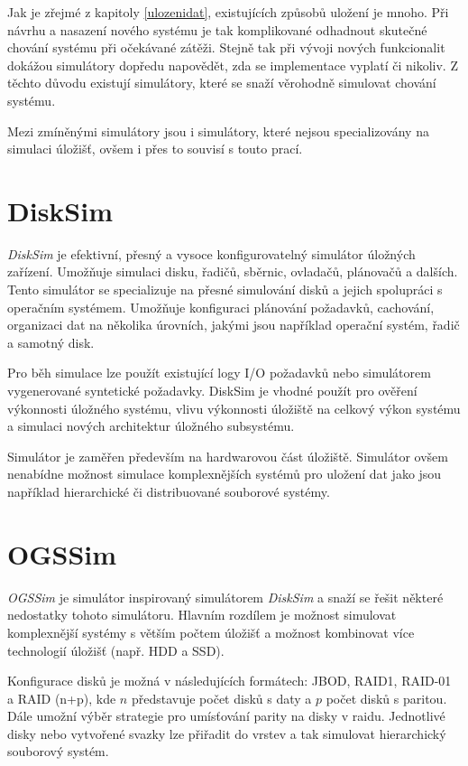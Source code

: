 \documentclass[czech,DP]{thesiskiv}
\begin{document}
Jak je zřejmé z kapitoly \ref{ulozenidat}, existujících způsobů uložení je mnoho. Při návrhu a nasazení nového systému je tak komplikované odhadnout skutečné chování systému při očekávané zátěži. Stejně tak při vývoji nových funkcionalit dokážou simulátory dopředu napovědět, zda se implementace vyplatí či nikoliv. Z těchto důvodu existují simulátory, které se snaží věrohodně simulovat chování systému.

Mezi zmíněnými simulátory jsou i simulátory, které nejsou specializovány na simulaci úložišť, ovšem i přes to souvisí s touto prací.

\section{DiskSim} 

\textit{DiskSim} \cite{disksimdoc} je efektivní, přesný a vysoce konfigurovatelný simulátor úložných zařízení. Umožňuje simulaci disku, řadičů, sběrnic, ovladačů, plánovačů a dalších. Tento simulátor se specializuje na přesné simulování disků a jejich spolupráci s operačním systémem. Umožňuje konfiguraci plánování požadavků, cachování, organizaci dat na několika úrovních, jakými jsou například operační systém, řadič a samotný disk.

Pro běh simulace lze použít existující logy I/O požadavků nebo simulátorem vygenerované syntetické požadavky. DiskSim je vhodné použít pro ověření výkonnosti úložného systému, vlivu výkonnosti úložiště na celkový výkon systému a simulaci nových architektur úložného subsystému. 

Simulátor je zaměřen především na hardwarovou část úložiště. Simulátor ovšem nenabídne možnost simulace komplexnějších systémů pro uložení dat jako jsou například hierarchické či distribuované souborové systémy.

\section{OGSSim}

\textit{OGSSim} \cite{ogssimpaper} je simulátor inspirovaný simulátorem \textit{DiskSim} a snaží se řešit některé nedostatky tohoto simulátoru. Hlavním rozdílem je možnost simulovat komplexnější systémy s větším počtem úložišť a možnost kombinovat více technologií úložišť (např. HDD a SSD).

Konfigurace disků je možná v následujících formátech: JBOD, RAID1, RAID-01 a RAID (n+p), kde $n$ představuje počet disků s daty a $p$ počet disků s paritou. Dále umožní výběr strategie pro umísťování parity na disky v raidu. Jednotlivé disky nebo vytvořené svazky lze přiřadit do vrstev a tak simulovat hierarchický souborový systém. 
\end{document}
